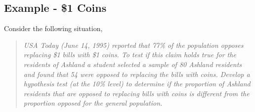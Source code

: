 \documentclass[10pt,openany]{book}\usepackage[]{graphicx}\usepackage[]{color}
\begin{document}
\subsection{Example - \$1 Coins}
Consider the following situation,
\begin{quote}
\textsl{USA Today (June 14, 1995) reported that 77\% of the population opposes replacing \$1 bills with \$1 coins.  To test if this claim holds true for the residents of Ashland a student selected a sample of 80 Ashland residents and found that 54 were opposed to replacing the bills with coins.  Develop a hypothesis test (at the 10\% level) to determine if the proportion of Ashland residents that are opposed to replacing bills with coins is different from the proportion opposed for the general population.}
\end{quote}
\end{document}

